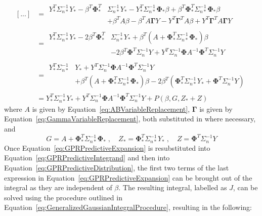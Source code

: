 \documentclass{article}
\begin{document}
\begin{equation}
\label{eq:GPRPredictiveExpansion}
	\begin{aligned}
	\left[...\right] &= 
	\begin{split}
	Y_*^T \Sigma_{n*}^{-1} Y_* - \beta^T \mathbf{\Phi}_*^T &\Sigma_{n*}^{-1} Y_* - Y_*^T \Sigma_{n*}^{-1} \mathbf{\Phi}_* \beta + \beta^T \mathbf{\Phi}_*^T \Sigma_{n*}^{-1} \mathbf{\Phi}_* \beta \\
	&+ \beta^T A \beta - \beta^T A \mathbf{\Gamma} Y - Y^T \mathbf{\Gamma}^T A \beta + Y^T \mathbf{\Gamma}^T A \mathbf{\Gamma} Y
	\end{split}
	\\
	&=
	\begin{split}
	Y_*^T \Sigma_{n*}^{-1} Y_* - 2 \beta^T \mathbf{\Phi}_*^T &\Sigma_{n*}^{-1} Y_* + \beta^T \left(A + \mathbf{\Phi}_*^T \Sigma_{n*}^{-1} \mathbf{\Phi}_*\right) \beta \\
	& - 2 \beta^T \mathbf{\Phi}^T \Sigma_n^{-1} Y + Y^T \Sigma_n^{-1} \mathbf{\Phi} A^{-1} \mathbf{\Phi}^T \Sigma_n^{-1} Y
	\end{split}
	\\
	&=
	\begin{split}
	Y_*^T \Sigma_{n*}^{-1} &Y_* + Y^T \Sigma_n^{-1} \mathbf{\Phi} A^{-1} \mathbf{\Phi}^T \Sigma_n^{-1} Y \\
	&+ \beta^T \! \left(A + \mathbf{\Phi}_*^T \Sigma_{n*}^{-1} \mathbf{\Phi}_*\right) \beta - 2 \beta^T \! \left(\mathbf{\Phi}_*^T \Sigma_{n*}^{-1} Y_* + \mathbf{\Phi}^T \Sigma_n^{-1} Y\right)
	\end{split}
	\\
	&= Y_*^T \Sigma_{n*}^{-1} Y_* + Y^T \Sigma_n^{-1} \mathbf{\Phi} A^{-1} \mathbf{\Phi}^T \Sigma_n^{-1} Y + P\!\left(\beta,G,Z_* + Z\right)
	\end{aligned}
\end{equation}
where $A$ is given by Equation~\eqref{eq:ABVariableReplacement}, $\mathbf{\Gamma}$ is given by Equation~\eqref{eq:GammaVariableReplacement}, both substituted in where necessary, and
\begin{equation}
\label{eq:IntegralVariableReplacement}
	G = A + \mathbf{\Phi}_*^T \Sigma_{n*}^{-1} \mathbf{\Phi}_* \; , \quad Z_* = \mathbf{\Phi}_*^T \Sigma_{n*}^{-1} Y_* \; , \quad Z = \mathbf{\Phi}^T \Sigma_n^{-1} Y
\end{equation}
Once Equation~\eqref{eq:GPRPredictiveExpansion} is resubstituted into Equation~\eqref{eq:GPRPredictiveIntegrand} and then into Equation~\eqref{eq:GPRPredictiveDistribution}, the first two terms of the last expression in Equation~\eqref{eq:GPRPredictiveExpansion} can be brought out of the integral as they are independent of $\beta$. The resulting integral, labelled as $J$, can be solved using the procedure outlined in Equation~\eqref{eq:GeneralizedGaussianIntegralProcedure}, resulting in the following:
\end{document}
